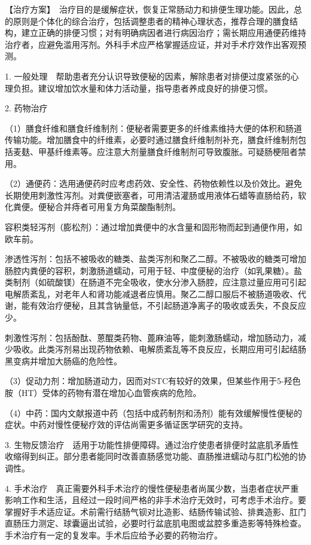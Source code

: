【治疗方案】　治疗目的是缓解症状，恢复正常肠动力和排便生理功能。因此，总的原则是个体化的综合治疗，包括调整患者的精神心理状态，推荐合理的膳食结构，建立正确的排便习惯；对有明确病因者进行病因治疗；需长期应用通便药维持治疗者，应避免滥用泻剂。外科手术应严格掌握适应证，并对手术疗效作出客观预测。

1.
一般处理　帮助患者充分认识导致便秘的因素，解除患者对排便过度紧张的心理负担。建议增加饮水量和体力活动量，指导患者养成良好的排便习惯。

2. 药物治疗

（1）膳食纤维和膳食纤维制剂：便秘者需要更多的纤维素维持大便的体积和肠道传输功能。增加膳食中的纤维素，必要时通过膳食纤维制剂补充，膳食纤维制剂包括麦麸、甲基纤维素等。应注意大剂量膳食纤维制剂可导致腹胀。可疑肠梗阻者禁用。

（2）通便药：选用通便药时应考虑药效、安全性、药物依赖性以及价效比。避免长期使用刺激性泻剂。对粪便嵌塞者，可用清洁灌肠或用液体石蜡等直肠给药，软化粪便。便秘合并痔者可用复方角菜酸酯制剂。

容积类轻泻剂（膨松剂）：通过增加粪便中的水含量和固形物而起到通便作用，如欧车前。

渗透性泻剂：包括不被吸收的糖类、盐类泻剂和聚乙二醇。不被吸收的糖类可增加肠腔内粪便的容积，刺激肠道蠕动，可用于轻、中度便秘的治疗（如乳果糖）。盐类制剂（如硫酸镁）在肠道不完全吸收，使水分渗入肠腔，应注意过量应用可引起电解质紊乱，对老年人和肾功能减退者应慎用。聚乙二醇口服后不被肠道吸收、代谢，能有效治疗便秘，且其含钠量低，不引起肠道净离子的吸收或丢失，不良反应少。

刺激性泻剂：包括酚酞、蒽醌类药物、蓖麻油等，能刺激肠蠕动，增加肠动力，减少吸收。此类泻剂易出现药物依赖、电解质紊乱等不良反应，长期应用可引起结肠黑变病并增加大肠癌的危险性。

（3）促动力剂：增加肠道动力，因而对STC有较好的效果，但某些作用于5-羟色胺（HT）受体的药物有潜在增加心血管疾病的危险。

（4）中药：国内文献报道中药（包括中成药制剂和汤剂）能有效缓解慢性便秘的症状。中药对慢性便秘疗效的评估尚需更多循证医学研究的支持。

3.
生物反馈治疗　适用于功能性排便障碍。通过治疗使患者排便时盆底肌矛盾性收缩得到纠正。部分患者能同时改善直肠感觉功能、直肠推进蠕动与肛门松弛的协调性。

4.
手术治疗　真正需要外科手术治疗的慢性便秘患者尚属少数，当患者症状严重影响工作和生活，且经过一段时间严格的非手术治疗无效时，可考虑手术治疗。要掌握好手术适应证。术前需行结肠气钡对比造影、结肠传输试验、排粪造影、肛门直肠压力测定、球囊逼出试验，必要时行盆底肌电图或盆腔多重造影等特殊检查。手术治疗有一定的复发率。手术后应给予必要的药物治疗。

